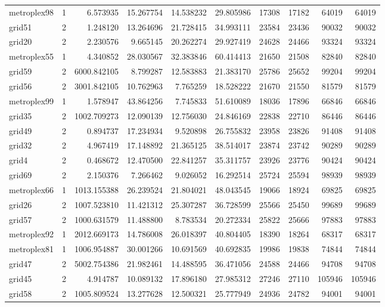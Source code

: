 \begin{longtable}{|l|r|r|r|r|r|r|r|r|r|}
metroplex98 & 1 & 6.573935 & 15.267754 & 14.538232 & 29.805986 & 17308 & 17182 & 64019 & 64019 \\
grid51 & 2 & 1.248120 & 13.264696 & 21.728415 & 34.993111 & 23584 & 23436 & 90032 & 90032 \\
grid20 & 2 & 2.230576 & 9.665145 & 20.262274 & 29.927419 & 24628 & 24466 & 93324 & 93324 \\
metroplex55 & 1 & 4.340852 & 28.030567 & 32.383846 & 60.414413 & 21650 & 21508 & 82840 & 82840 \\
grid59 & 2 & 6000.842105 & 8.799287 & 12.583883 & 21.383170 & 25786 & 25652 & 99204 & 99204 \\
grid56 & 2 & 3001.842105 & 10.762963 & 7.765259 & 18.528222 & 21670 & 21550 & 81579 & 81579 \\
metroplex99 & 1 & 1.578947 & 43.864256 & 7.745833 & 51.610089 & 18036 & 17896 & 66846 & 66846 \\
grid35 & 2 & 1002.709273 & 12.090139 & 12.756030 & 24.846169 & 22838 & 22710 & 86446 & 86446 \\
grid49 & 2 & 0.894737 & 17.234934 & 9.520898 & 26.755832 & 23958 & 23826 & 91408 & 91408 \\
grid32 & 2 & 4.967419 & 17.148892 & 21.365125 & 38.514017 & 23874 & 23742 & 90289 & 90289 \\
grid4 & 2 & 0.468672 & 12.470500 & 22.841257 & 35.311757 & 23926 & 23776 & 90424 & 90424 \\
grid69 & 2 & 2.150376 & 7.266462 & 9.026052 & 16.292514 & 25724 & 25594 & 98939 & 98939 \\
metroplex66 & 1 & 1013.155388 & 26.239524 & 21.804021 & 48.043545 & 19066 & 18924 & 69825 & 69825 \\
grid26 & 2 & 1007.523810 & 11.421312 & 25.307287 & 36.728599 & 25566 & 25450 & 99689 & 99689 \\
grid57 & 2 & 1000.631579 & 11.488800 & 8.783534 & 20.272334 & 25822 & 25666 & 97883 & 97883 \\
metroplex92 & 1 & 2012.669173 & 14.786008 & 26.018397 & 40.804405 & 18390 & 18264 & 68317 & 68317 \\
metroplex81 & 1 & 1006.954887 & 30.001266 & 10.691569 & 40.692835 & 19986 & 19838 & 74844 & 74844 \\
grid47 & 2 & 5002.754386 & 21.982461 & 14.488595 & 36.471056 & 24588 & 24466 & 94708 & 94708 \\
grid45 & 2 & 4.914787 & 10.089132 & 17.896180 & 27.985312 & 27246 & 27110 & 105946 & 105946 \\
grid58 & 2 & 1005.809524 & 13.277628 & 12.500321 & 25.777949 & 24936 & 24782 & 94001 & 94001 \\

\end{longtable}
